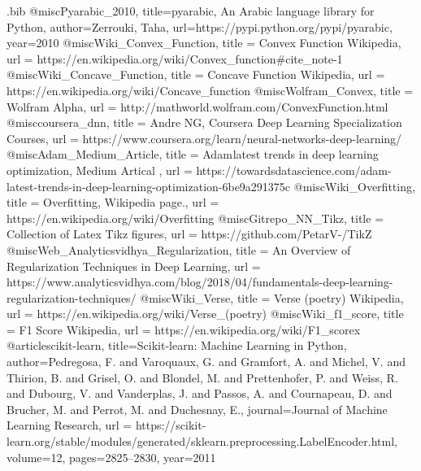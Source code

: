 \begin{filecontents}{\jobname.bib}
@misc{Pyarabic_2010,
  title={pyarabic, An Arabic language library for Python},
  author={Zerrouki, Taha},
  url={https://pypi.python.org/pypi/pyarabic},
  year={2010}
}
@misc{Wiki_Convex_Function,
  title =	 {Convex Function Wikipedia},
  url =		 {https://en.wikipedia.org/wiki/Convex\_function\#cite\_note-1}
}
@misc{Wiki_Concave_Function,
  title =	 {Concave Function Wikipedia},
  url =		 {https://en.wikipedia.org/wiki/Concave\_function}
}
@misc{Wolfram_Convex,
  title =	 {Wolfram Alpha},
  url =		 {http://mathworld.wolfram.com/ConvexFunction.html}
}
@misc{coursera_dnn,
  title =	 {Andre NG, Coursera Deep Learning Specialization Courses},
  url =		 {https://www.coursera.org/learn/neural-networks-deep-learning/}
}
@misc{Adam_Medium_Article,
  title =	 {Adam latest trends in deep learning optimization, Medium Artical },
  url =		 {https://towardsdatascience.com/adam-latest-trends-in-deep-learning-optimization-6be9a291375c}
}
@misc{Wiki_Overfitting,
  title =	 {Overfitting, Wikipedia page.},
  url =		 {https://en.wikipedia.org/wiki/Overfitting}
}
@misc{Gitrepo_NN_Tikz,
  title =	 {Collection of Latex Tikz figures},
  url =		 {https://github.com/PetarV-/TikZ}
}
@misc{Web_Analyticsvidhya_Regularization,
  title =	 {An Overview of Regularization Techniques in Deep Learning},
  url =		 {https://www.analyticsvidhya.com/blog/2018/04/fundamentals-deep-learning-regularization-techniques/}
}
@misc{Wiki_Verse,
  title =	 {Verse (poetry) Wikipedia},
  url =		 {https://en.wikipedia.org/wiki/Verse\_(poetry)}
}
@misc{Wiki_f1_score,
  title =	 {F1 Score Wikipedia},
  url =		 {https://en.wikipedia.org/wiki/F1\_scorex}
}
@article{scikit-learn,
 title={Scikit-learn: Machine Learning in Python},
 author={Pedregosa, F. and Varoquaux, G. and Gramfort, A. and Michel, V.
         and Thirion, B. and Grisel, O. and Blondel, M. and Prettenhofer, P.
         and Weiss, R. and Dubourg, V. and Vanderplas, J. and Passos, A. and
         Cournapeau, D. and Brucher, M. and Perrot, M. and Duchesnay, E.},
 journal={Journal of Machine Learning Research},
 url = {https://scikit-learn.org/stable/modules/generated/sklearn.preprocessing.LabelEncoder.html},
 volume={12},
 pages={2825--2830},
 year={2011}
}

\end{filecontents}


